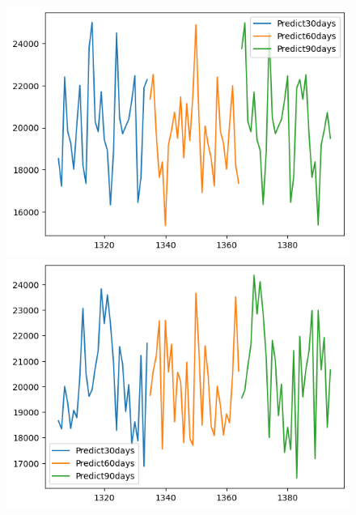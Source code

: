 \begin{figure}[H]
\begin{minipage}{0.15\textwidth}
    \includegraphics[width=1\textwidth]{resources/chapter-5/newdata1/predicted/EXB_ML_7_3_30days.png}
    \end{minipage}
    \hfill
    \begin{minipage}{0.15\textwidth}
    \centering
    \includegraphics[width=1\textwidth]{resources/chapter-5/newdata1/predicted/EXB_ML_8_2_30days.png}
    \end{minipage}
    \hfill
        \begin{minipage}{0.15\textwidth}
    \centering

\end{minipage}
\end{figure}
